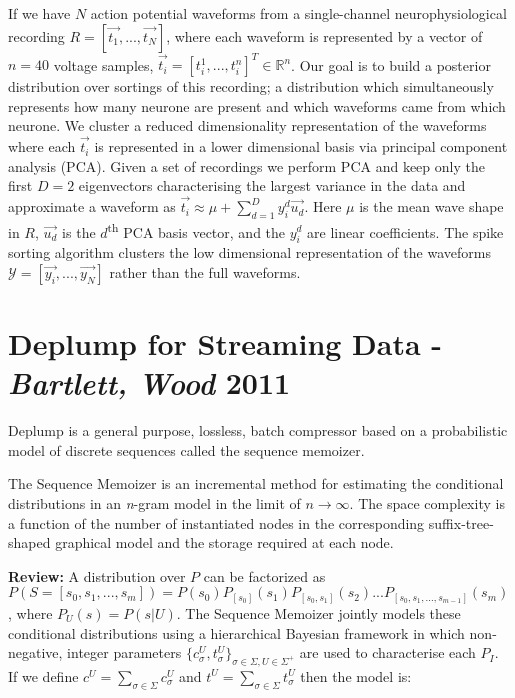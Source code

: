 If we have $N$ action potential waveforms from a single-channel neurophysiological recording $R=[\overrightarrow{t_{1}}, ..., \overrightarrow{t_{N}}]$, where each waveform is represented by a vector of $n=40$ voltage samples, $\overrightarrow{t_{i}}=[t_{i}^{1}, ..., t_{i}^{n}]^{T}\in \mathbb{R}^{n}$. Our goal is to build a posterior distribution over sortings of this recording; a distribution which simultaneously represents how many neurone are present and which waveforms came from which neurone. We cluster a reduced dimensionality representation of the waveforms where each $\overrightarrow{t_{i}}$ is represented in a lower dimensional basis via principal component analysis (PCA). Given a set of recordings we perform PCA and keep only the first $D=2$ eigenvectors characterising the largest variance in the data and approximate a waveform as $\overrightarrow{t_{i}}\approx \mu +\sum_{d=1}^{D}y_{i}^{d}\overrightarrow{u_{d}}$. Here $\mu$ is the mean wave shape in $R$, $\overrightarrow{u_{d}}$ is the $d$\textsuperscript{th} PCA basis vector, and the $y_{i}^{d}$ are linear coefficients. The spike sorting algorithm clusters the low dimensional representation of the waveforms $\mathcal{Y}=[\overrightarrow{y_{i}}, ..., \overrightarrow{y_{N}}]$ rather than the full waveforms.

\section{Deplump for Streaming Data - \textit{Bartlett, Wood} 2011} \cite{bartlett2011deplump}

Deplump is a general purpose, lossless, batch compressor based on a probabilistic model of discrete sequences called the sequence memoizer.

The Sequence Memoizer is an incremental method for estimating the conditional distributions in an \textit{n}-gram model in the limit of $n\to\infty$. The space complexity is a function of the number of instantiated nodes in the corresponding suffix-tree-shaped graphical model and the storage required at each node.

\textbf{Review:} A distribution over $P$ can be factorized as $P(S=[s_{0}, s_{1}, ..., s_{m}])=P(s_{0})P_{[s_{0}]}(s_{1})P_{[s_{0}, s_{1}]}(s_{2})...P_{[s_{0}, s_{1}, ..., s_{m-1}]}(s_{m})$, where $P_{U}(s)=P(s|U)$. The Sequence Memoizer jointly models these conditional distributions using a hierarchical Bayesian framework in which non-negative, integer parameters $\{c_{\sigma}^{U}, t_{\sigma}^{U}\}_{\sigma \in \Sigma, U \in \Sigma^{+}}$ are used to characterise each $P_{I}$. If we define $c^{U}=\sum_{\sigma\in\Sigma}c_{\sigma}^{U}$ and $t^{U}=\sum_{\sigma\in\Sigma}t_{\sigma}^{U}$ then the model is:

